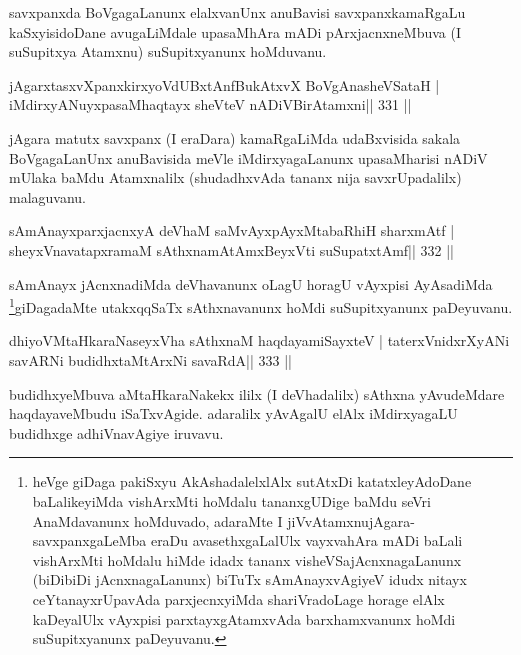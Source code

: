 \begin{artha}
savxpanxda BoVgagaLanunx elalxvanUnx anuBavisi savxpanxkamaRgaLu  kaSxyisidoDane avugaLiMdale upasaMhAra mADi pArxjacnxneMbuva (I suSupitxya Atamxnu) suSupitxyanunx hoMduvanu.
\end{artha}


\begin{shl}
jAgarxtasxvXpanxkirxyoVdUBxtAnfBukAtxvX BoVgAnasheVSataH |
iMdirxyANuyxpasaMhaqtayx sheVteV nADiVBirAtamxni\hfill || 331 ||
\end{shl}

\begin{artha}
jAgara matutx savxpanx (I eraDara) kamaRgaLiMda udaBxvisida sakala BoVgagaLanUnx anuBavisida meVle iMdirxyagaLanunx upasaMharisi nADiV mUlaka baMdu Atamxnalilx (shudadhxvAda tananx nija savxrUpadalilx) malaguvanu.
\end{artha}

\begin{shl}
sAmAnayxparxjacnxyA deVhaM saMvAyxpAyxMtabaRhiH sharxmAtf |
sheyxVnavatapxramaM sAthxnamAtAmx\s BeyxVti suSupatxtAmf\hfill || 332 ||
\end{shl}

\begin{artha}
sAmAnayx jAcnxnadiMda deVhavanunx oLagU horagU vAyxpisi AyAsadiMda 
\footnote{heVge giDaga pakiSxyu AkAshadalelxlAlx sutAtxDi katatxleyAdoDane 
baLalikeyiMda vishArxMti hoMdalu tananxgUDige baMdu seVri AnaMdavanunx 
hoMduvado, adaraMte I jiVvAtamxnu\break jAgara-savxpanxgaLeMba eraDu avasethxgaLalUlx vayxvahAra mADi baLali vishArxMti hoMdalu hiMde idadx tananx visheVSajAcnxnagaLanunx (biDibiDi jAcnxnagaLanunx) biTuTx sAmAnayxvAgiyeV idudx nitayx ceYtanayxrUpavAda parxjecnxyiMda shariVradoLage horage elAlx kaDeyalUlx vAyxpisi parxtayxgAtamxvAda barxhamxvanunx hoMdi suSupitxyanunx paDeyuvanu.}giDagadaMte utakxqqSaTx sAthxnavanunx hoMdi suSupitxyanunx paDeyuvanu.
\end{artha}

\begin{shl}
dhiyoV\s MtaHkaraNaseyxVha sAthxnaM haqdayamiSayxteV |
taterxVnidxrXyANi savARNi budidhxtaMtArxNi savaRdA\hfill || 333 ||
\end{shl}

\begin{artha}
budidhxyeMbuva aMtaHkaraNakekx ililx (I deVhadalilx) sAthxna  yAvudeMdare haqdayaveMbudu iSaTxvAgide. adaralilx yAvAgalU elAlx iMdirxyagaLU budidhxge adhiVnavAgiye iruvavu.
\end{artha}

